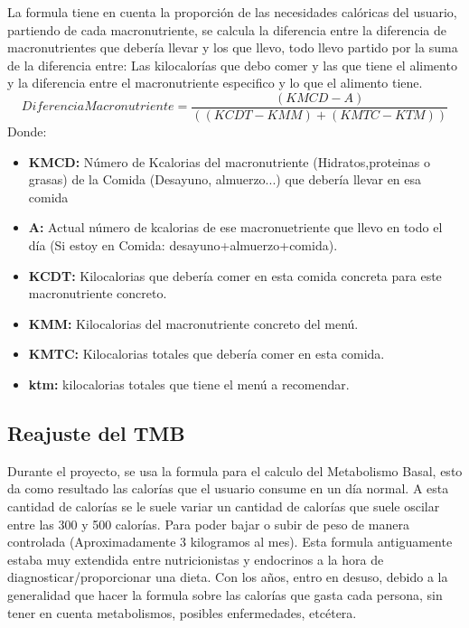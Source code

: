 La formula tiene en cuenta la proporción de las necesidades calóricas del usuario, partiendo de cada macronutriente, se calcula la diferencia entre la diferencia de macronutrientes que debería llevar y los que llevo, todo llevo partido por la suma de la diferencia entre: Las kilocalorías que debo comer y las que tiene el alimento y la diferencia entre el macronutriente especifico y lo que el alimento tiene.\\
\begin{equation}
DiferenciaMacronutriente = \frac{(KMCD - A)}{((KCDT-KMM)+(KMTC-KTM))}
\end{equation}
Donde:
\begin{itemize}
\item \textbf{KMCD:} Número de Kcalorias del macronutriente (Hidratos,proteinas o grasas) de la Comida (Desayuno, almuerzo...) que debería llevar en esa comida
\item \textbf{A:} Actual número de kcalorias de ese macronuetriente que llevo en todo el día (Si estoy en Comida: desayuno+almuerzo+comida).
\item \textbf{KCDT:} Kilocalorias que debería comer en esta comida concreta para este macronutriente concreto.
\item \textbf{KMM:} Kilocalorias del macronutriente concreto del menú.
\item \textbf{KMTC:} Kilocalorias totales que debería comer en esta comida.
\item \textbf{ktm:} kilocalorias totales que tiene el menú a recomendar.
\end{itemize}

\subsection{Reajuste del TMB}
Durante el proyecto, se usa la formula para el calculo del Metabolismo Basal, esto da como resultado las calorías que el usuario consume en un día normal. A esta cantidad de calorías se le suele variar un cantidad de calorías que suele oscilar entre las 300 y 500 calorías. Para poder bajar o subir de peso de manera controlada (Aproximadamente 3 kilogramos al mes). Esta formula antiguamente estaba muy extendida entre nutricionistas y endocrinos a la hora de diagnosticar/proporcionar una dieta. Con los años, entro en desuso, debido a la generalidad que hacer la formula sobre las calorías que gasta cada persona, sin tener en cuenta metabolismos, posibles enfermedades, etcétera.\\


